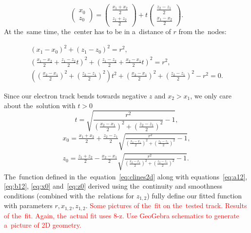				\begin{equation}
					\begin{pmatrix} x_0\\ z_0 \end{pmatrix} = \begin{pmatrix} \frac{x_1+x_2}{2}\\ \frac{z_1+z_2}{2} \end{pmatrix} + t \begin{pmatrix} \frac{z_2-z_1}{2}\\ \frac{x_1-x_2}{2} \end{pmatrix}.
				\end{equation}
			At the~same time, the~center has to be in a~distance of $r$ from the~nodes:
				\begin{linenomath}
				\begin{gather}
					(x_1-x_0)^2 + (z_1-z_0)^2 = r^2,\\
					\left(\frac{x_1-x_2}{2}+\frac{z_1-z_2}{2}t\right)^2 + \left(\frac{z_1-z_2}{2}+\frac{x_2-x_1}{2}t\right)^2 = r^2,\\
					\left(\left(\frac{x_2-x_1}{2}\right)^2+\left(\frac{z_2-z_1}{2}\right)^2\right)t^2+\left(\frac{x_2-x_1}{2}\right)^2+\left(\frac{z_2-z_1}{2}\right)^2-r^2=0.
				\end{gather}
				\end{linenomath}
			Since our electron track bends towards negative $z$ and $x_2 > x_1$, we only care about the~solution with $t>0$
				\begin{equation}
					t = \sqrt{\frac{r^2}{\left(\frac{x_2-x_1}{2}\right)^2+\left(\frac{z_2-z_1}{2}\right)^2}-1},
				\end{equation}
				\begin{align}
					x_0 = \frac{x_1+x_2}{2} + \frac{z_2-z_1}{2} \sqrt{\frac{r^2}{\left(\frac{x_2-x_1}{2}\right)^2+\left(\frac{z_2-z_1}{2}\right)^2}-1},\label{eq:x0}\\
					z_0 = \frac{z_1+z_2}{2} - \frac{x_2-x_1}{2} \sqrt{\frac{r^2}{\left(\frac{x_2-x_1}{2}\right)^2+\left(\frac{z_2-z_1}{2}\right)^2}-1}.\label{eq:z0}
				\end{align}
			The~function defined in the~equation~\ref{eq:clines2d} along with equations~\ref{eq:a12}, \ref{eq:b12}, \ref{eq:x0} and~\ref{eq:z0} derived using the~continuity and smoothness conditions (combined with the~relations for $z_{1,2}$) fully define our fitted function with parameters $r,x_{1,2},z_{1,2}$. \textcolor{red}{Some pictures of the~fit on the~tested track. Results of the~fit. Again, the~actual fit uses 8-z. Use GeoGebra schematics to generate a~picture of 2D geometry.}
			
